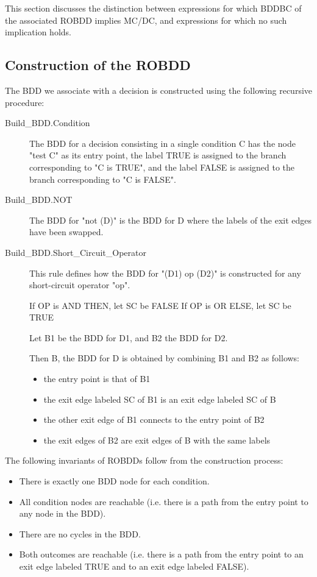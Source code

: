 \documentclass[a4paper,12pt,twoside]{article}
\begin{document}
This section discusses the distinction between expressions for which
BDDBC of the associated ROBDD implies MC/DC, and expressions for which
no such implication holds.

\subsection{Construction of the ROBDD}

The BDD we associate with a decision is constructed using the following
recursive procedure:

\begin{description}
\item[Build\_BDD.Condition]
  The BDD for a decision consisting in a single condition C has the node
  "test C" as its entry point, the label TRUE is assigned to the branch
  corresponding to "C is TRUE", and the label FALSE is assigned to the
  branch corresponding to "C is FALSE".

\item[Build\_BDD.NOT]
  The BDD for "not (D)" is the BDD for D where the labels of the exit
  edges have been swapped.

\item[Build\_BDD.Short\_Circuit\_Operator]
  This rule defines how the BDD for "(D1) op (D2)" is constructed for
  any short-circuit operator "op".

  If OP is AND THEN, let SC be FALSE
  If OP is OR ELSE, let SC be TRUE

  Let B1 be the BDD for D1, and B2 the BDD for D2.

  Then B, the BDD for D is obtained by combining B1 and B2 as follows:
  \begin{itemize}
    \item the entry point is that of B1
    \item the exit edge labeled SC of B1 is an exit edge labeled SC of B
    \item the other exit edge of B1 connects to the entry point of B2
    \item the exit edges of B2 are exit edges of B with the same labels
  \end{itemize}
\end{description}

The following invariants of ROBDDs follow from the construction process:
\begin{itemize}
  \item There is exactly one BDD node for each condition.
  \item All condition nodes are reachable (i.e. there is a path from
        the entry point to any node in the BDD).
  \item There are no cycles in the BDD.
  \item Both outcomes are reachable (i.e. there is a path from the entry point
        to an exit edge labeled TRUE and to an exit edge labeled FALSE).
\end{itemize}
\end{document}
